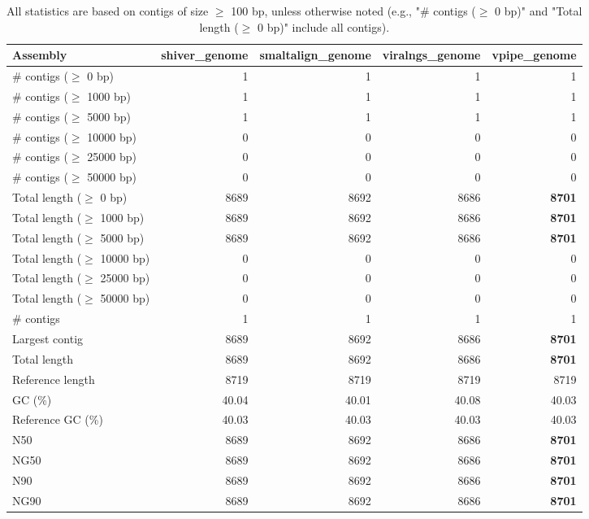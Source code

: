 \documentclass[12pt,a4paper]{article}
\begin{document}
\begin{table}[ht]
\begin{center}
\caption{All statistics are based on contigs of size $\geq$ 100 bp, unless otherwise noted (e.g., "\# contigs ($\geq$ 0 bp)" and "Total length ($\geq$ 0 bp)" include all contigs).}
\begin{tabular}{|l*{4}{|r}|}
\hline
Assembly & shiver\_genome & smaltalign\_genome & viralngs\_genome & vpipe\_genome \\ \hline
\# contigs ($\geq$ 0 bp) & 1 & 1 & 1 & 1 \\ \hline
\# contigs ($\geq$ 1000 bp) & 1 & 1 & 1 & 1 \\ \hline
\# contigs ($\geq$ 5000 bp) & 1 & 1 & 1 & 1 \\ \hline
\# contigs ($\geq$ 10000 bp) & 0 & 0 & 0 & 0 \\ \hline
\# contigs ($\geq$ 25000 bp) & 0 & 0 & 0 & 0 \\ \hline
\# contigs ($\geq$ 50000 bp) & 0 & 0 & 0 & 0 \\ \hline
Total length ($\geq$ 0 bp) & 8689 & 8692 & 8686 & {\bf 8701} \\ \hline
Total length ($\geq$ 1000 bp) & 8689 & 8692 & 8686 & {\bf 8701} \\ \hline
Total length ($\geq$ 5000 bp) & 8689 & 8692 & 8686 & {\bf 8701} \\ \hline
Total length ($\geq$ 10000 bp) & 0 & 0 & 0 & 0 \\ \hline
Total length ($\geq$ 25000 bp) & 0 & 0 & 0 & 0 \\ \hline
Total length ($\geq$ 50000 bp) & 0 & 0 & 0 & 0 \\ \hline
\# contigs & 1 & 1 & 1 & 1 \\ \hline
Largest contig & 8689 & 8692 & 8686 & {\bf 8701} \\ \hline
Total length & 8689 & 8692 & 8686 & {\bf 8701} \\ \hline
Reference length & 8719 & 8719 & 8719 & 8719 \\ \hline
GC (\%) & 40.04 & 40.01 & 40.08 & 40.03 \\ \hline
Reference GC (\%) & 40.03 & 40.03 & 40.03 & 40.03 \\ \hline
N50 & 8689 & 8692 & 8686 & {\bf 8701} \\ \hline
NG50 & 8689 & 8692 & 8686 & {\bf 8701} \\ \hline
N90 & 8689 & 8692 & 8686 & {\bf 8701} \\ \hline
NG90 & 8689 & 8692 & 8686 & {\bf 8701} \\ \hline

\end{tabular}
\end{center}
\end{table}
\end{document}
